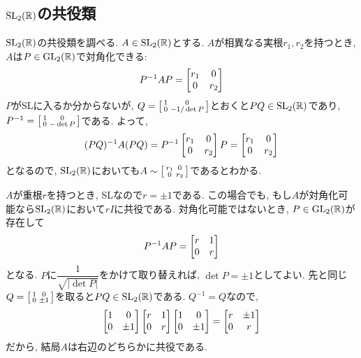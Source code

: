 \subsection{$\mathrm{SL}_2(\mathbb{R})$の共役類}
$\mathrm{SL}_{2}(\mathbb{R})$の共役類を調べる. $A\in \mathrm{SL}_{2}(\mathbb{R})$とする. $A$が相異なる実根$r_1,r_2$を持つとき, $A$は$P\in \mathrm{GL}_{2}(\mathbb{R})$で対角化できる:
\[P^{-1} A P = \begin{bmatrix}r_1 & 0 \\ 0 & r_2\end{bmatrix}\]
$P$がSLに入るか分からないが, $Q=\left[\begin{smallmatrix}1&0 \\ 0 & -1/\det{P}\end{smallmatrix}\right]$とおくと$PQ\in \mathrm{SL}_{2}(\mathbb{R})$であり, $P^{-1} = \left[\begin{smallmatrix}1 & 0 \\ 0 & -\det{P}\end{smallmatrix}\right]$である. よって,
\[(PQ)^{-1} A (PQ) = P^{-1}\begin{bmatrix}r_1 & 0 \\ 0 & r_2\end{bmatrix}P = \begin{bmatrix}r_1 & 0 \\ 0 & r_2\end{bmatrix}\]
となるので, $\mathrm{SL}_{2}(\mathbb{R})$においても$A\sim \left[\begin{smallmatrix}r_1 & 0 \\ 0 & r_2\end{smallmatrix}\right]$であるとわかる. \par
$A$が重根$r$を持つとき, SLなので$r=\pm 1$である. この場合でも, もし$A$が対角化可能なら$\mathrm{SL}_{2}(\mathbb{R})$において$rI$に共役である. 対角化可能ではないとき, $P\in \mathrm{GL}_{2}(\mathbb{R})$が存在して
\[P^{-1}A P = \begin{bmatrix}r & 1 \\ 0 & r\end{bmatrix}\]
となる. $P$に$\dfrac{1}{\sqrt{|\det{P}|}}$をかけて取り替えれば, $\det{P} = \pm 1$としてよい. 先と同じ$Q = \left[\begin{smallmatrix}1 & 0 \\ 0 & \pm 1\end{smallmatrix}\right]$を取ると$PQ\in \mathrm{SL}_{2}(\mathbb{R})$である. $Q^{-1} = Q$なので,
\[
\begin{bmatrix}
1 & 0 \\ 0 & \pm 1
\end{bmatrix} \begin{bmatrix}r & 1 \\ 0 & r\end{bmatrix} \begin{bmatrix}1 & 0 \\ 0 & \pm 1\end{bmatrix} = \begin{bmatrix}r & \pm 1\\ 0 & r\end{bmatrix}
\]
だから, 結局$A$は右辺のどちらかに共役である.
{\small
{}
}

